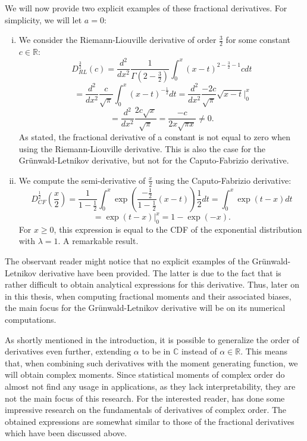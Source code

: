 We will now provide two explicit examples of these fractional derivatives. For simplicity, we will let \(a = 0\):
\begin{example}
    \begin{enumerate}[(i)]
        \item 
    
    We consider the Riemann-Liouville derivative of order \(\frac{3}{2}\) for some constant \(c \in \mathbb{R}\):
    \[D^{\frac{3}{2}}_{RL}(c) = \frac{d^2}{dx^2} \frac{1}{\Gamma(2 - \frac{3}{2})}  \int_{0}^{x} (x-t)^{2 - \frac{3}{2}-1} c dt\]
    \[= \frac{d^2}{dx^2} \frac{c}{\sqrt{\pi}}  \int_{0}^{x} (x-t)^{- \frac{1}{2}} dt = \frac{d^2}{dx^2} \frac{-2c}{\sqrt{\pi}} \sqrt{x - t} \Big|_{0}^{x}\]
    \[= \frac{d^2}{dx^2} \frac{2c \sqrt{x}}{\sqrt{\pi}} = \frac{-c}{2x\sqrt{\pi x}} \neq 0.\] As stated, the fractional derivative of a constant is not equal to zero when using the Riemann-Liouville derivative. This is also the case for the Grünwald-Letnikov derivative, but not for the Caputo-Fabrizio derivative.
    \item We compute the semi-derivative of \(\frac{x}{2}\) using the Caputo-Fabrizio derivative:
    \[D^{\frac{1}{2}}_{CF}\left(\frac{x}{2}\right) = \frac{1}{1 - \frac{1}{2}}  \int_{0}^{x} \exp\left(\frac{-\frac{1}{2}}{1 - \frac{1}{2}}(x-t)\right) \frac{1}{2} dt = \int_{0}^{x} \exp(t - x) dt\]
    \[ =  \exp(t - x) \Big|_{0}^{x} = 1 - \exp(- x).\]
    For \(x \geq 0\), this expression is equal to the CDF of the exponential distribution with \(\lambda = 1\). A remarkable result.
    
    \end{enumerate}
\end{example}
The observant reader might notice that no explicit examples of the Grünwald-Letnikov derivative have been provided. The latter is due to the fact that is rather difficult to obtain analytical expressions for this derivative. Thus, later on in this thesis, when computing fractional moments and their associated biases, the main focus for the Grünwald-Letnikov derivative will be on its numerical computations.
\begin{remark}
    
As shortly mentioned in the introduction, it is possible to generalize the order of derivatives even further, extending \(\alpha\) to be in \(\mathbb{C}\) instead of \(\alpha \in \mathbb{R}\). This means that, when combining such derivatives with the moment generating function, we will obtain complex moments. Since statistical moments of complex order do almost not find any usage in applications, as they lack interpretability, they are not the main focus of this research. For the interested reader, \cite{love1971} has done some impressive research on the fundamentals of derivatives of complex order. The obtained expressions are somewhat similar to those of the fractional derivatives which have been discussed above.
\end{remark}